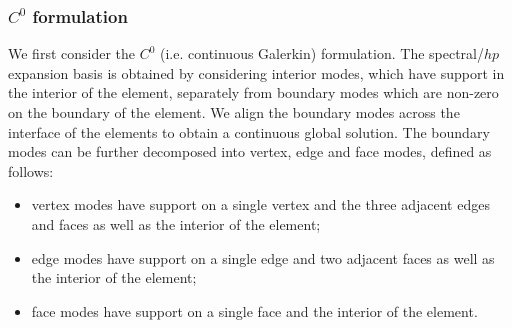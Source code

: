 \subsubsection{$C^0$ formulation}

We first consider the $C^0$ (i.e. continuous Galerkin) formulation. The
spectral/$hp$ expansion basis is obtained by considering interior modes, which
have support in the interior of the element, separately from boundary modes
which are non-zero on the boundary of the element. We align the boundary modes
across the interface of the elements to obtain a continuous global solution. The
boundary modes can be further decomposed into vertex, edge and face modes,
defined as follows:

\begin{itemize}
  \item vertex modes have support on a single vertex and the three adjacent
  edges and faces as well as the interior of the element;
  \item edge modes have support on a single edge and two adjacent faces as well
  as the interior of the element; 
  \item face modes have support on a single face and the interior of the
  element.
\end{itemize}

